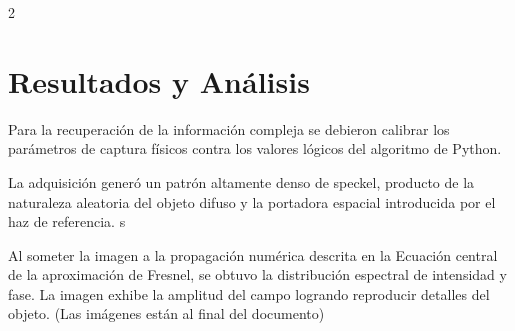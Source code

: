 \documentclass[letterpaper]{article}
\begin{document}
\begin{multicols}{2}
		\section*{Resultados y Análisis}
		
		Para la recuperación de la información compleja se debieron calibrar los parámetros de captura físicos contra los valores lógicos del algoritmo de Python.
		
		\begin{table}[H]
			\centering
			\caption{Parámetros del Sistema y Reconstrucción}
			\vspace{0.3cm}
		\end{table}
		
		\vspace{0.3cm}
		
		La adquisición generó un patrón altamente denso de speckel, producto de la naturaleza aleatoria del objeto difuso y la portadora espacial introducida por el haz de referencia.
		s
		
		Al someter la imagen a la propagación numérica descrita en la Ecuación central de la aproximación de Fresnel, se obtuvo la distribución espectral de intensidad y fase. La imagen exhibe la amplitud del campo logrando reproducir detalles del objeto. (Las imágenes están al final del documento)
		
		
		

\end{multicols}
\end{document}
